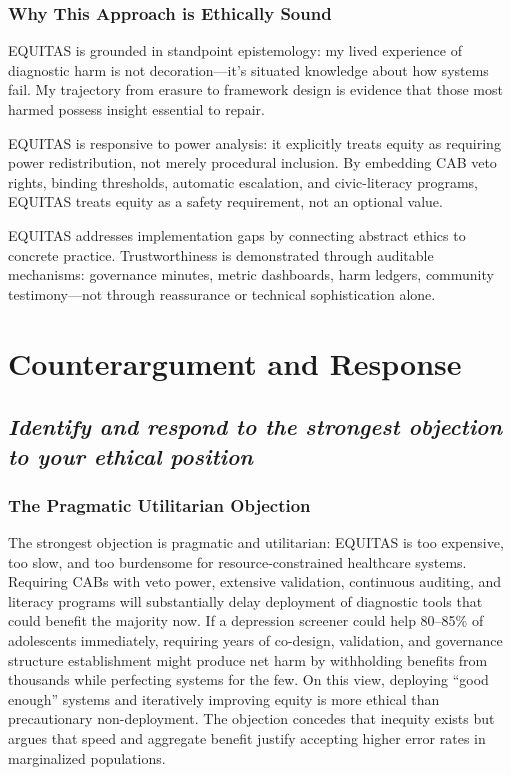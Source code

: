 \documentclass[12pt,a4paper]{article}
\begin{document}
\subsubsection{Why This Approach is Ethically Sound}

EQUITAS is grounded in standpoint epistemology: my lived experience of diagnostic harm is not decoration—it's situated knowledge about how systems fail. My trajectory from erasure to framework design is evidence that those most harmed possess insight essential to repair.\cite{garcia_ed415}

EQUITAS is responsive to power analysis: it explicitly treats equity as requiring power redistribution, not merely procedural inclusion. By embedding CAB veto rights, binding thresholds, automatic escalation, and civic-literacy programs, EQUITAS treats equity as a safety requirement, not an optional value.

EQUITAS addresses implementation gaps by connecting abstract ethics to concrete practice. Trustworthiness is demonstrated through auditable mechanisms: governance minutes, metric dashboards, harm ledgers, community testimony—not through reassurance or technical sophistication alone.

\section{Counterargument and Response}

\subsection*{\textit{Identify and respond to the strongest objection to your ethical position}}

\subsubsection{The Pragmatic Utilitarian Objection}

The strongest objection is pragmatic and utilitarian: EQUITAS is too expensive, too slow, and too burdensome for resource-constrained healthcare systems. Requiring CABs with veto power, extensive validation, continuous auditing, and literacy programs will substantially delay deployment of diagnostic tools that could benefit the majority now. If a depression screener could help 80--85\% of adolescents immediately, requiring years of co-design, validation, and governance structure establishment might produce net harm by withholding benefits from thousands while perfecting systems for the few. On this view, deploying ``good enough'' systems and iteratively improving equity is more ethical than precautionary non-deployment. The objection concedes that inequity exists but argues that speed and aggregate benefit justify accepting higher error rates in marginalized populations.
\end{document}

